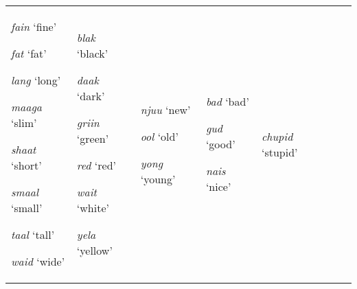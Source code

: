\begin{table}
{\begin{tabular}{p{2cm}p{2cm}p{2cm}p{1.7cm}p{1.7cm}p{2.7cm}p{2cm}}
                                      \textit{fain} `fine'

                                      \textit{fat} `fat'

                                      \textit{lang} `long'

                                      \textit{maaga} `slim'

                                      \textit{shaat} `short'

                                      \textit{smaal} `small'

                                      \textit{taal} `tall'

                                      \textit{waid} `wide'

                                                            &
 
                                                              \textit{blak} ‘black’

                                                              \textit{daak} ‘dark’

                                                              \textit{griin} ‘green’

                                                              \textit{red} `red'

                                                              \textit{wait} `white'

                                                              \textit{yela} `yellow' 
                                                                                & 

                                                                                  \textit{njuu} `new'

                                                                                  \textit{ool} `old'

                                                                                  \textit{yong} `young'

                                                                                                  &
                                                                                                    \textit{bad} `bad'

                                                                                                    \textit{gud} `good'

                                                                                                    \textit{nais} `nice'
                                                                                                                      &
                                                                                                                        \textit{chupid} `stupid'


\end{tabular}}
\end{table}
